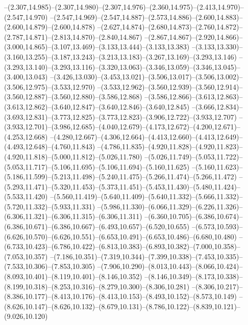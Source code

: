   --(2.307,14.985)--(2.307,14.980)--(2.307,14.976)--(2.360,14.975)--(2.413,14.970)--(2.547,14.970)%
  --(2.547,14.969)--(2.547,14.887)--(2.573,14.886)--(2.600,14.883)--(2.600,14.879)--(2.600,14.878)%
  --(2.627,14.874)--(2.680,14.873)--(2.760,14.872)--(2.787,14.871)--(2.813,14.870)--(2.840,14.867)%
  --(2.867,14.867)--(2.920,14.866)--(3.000,14.865)--(3.107,13.469)--(3.133,13.444)--(3.133,13.383)%
  --(3.133,13.330)--(3.160,13.255)--(3.187,13.243)--(3.213,13.183)--(3.267,13.169)--(3.293,13.146)%
  --(3.293,13.140)--(3.293,13.116)--(3.320,13.063)--(3.346,13.059)--(3.346,13.045)--(3.400,13.043)%
  --(3.426,13.030)--(3.453,13.021)--(3.506,13.017)--(3.506,13.002)--(3.506,12.975)--(3.533,12.970)%
  --(3.533,12.962)--(3.560,12.939)--(3.560,12.914)--(3.560,12.887)--(3.560,12.880)--(3.586,12.868)%
  --(3.586,12.866)--(3.613,12.863)--(3.613,12.862)--(3.640,12.847)--(3.640,12.846)--(3.640,12.845)%
  --(3.666,12.834)--(3.693,12.831)--(3.773,12.825)--(3.773,12.823)--(3.906,12.722)--(3.933,12.707)%
  --(3.933,12.701)--(3.986,12.685)--(4.040,12.679)--(4.173,12.672)--(4.200,12.671)--(4.253,12.668)%
  --(4.280,12.667)--(4.306,12.664)--(4.413,12.660)--(4.413,12.649)--(4.493,12.648)--(4.760,11.843)%
  --(4.786,11.835)--(4.920,11.828)--(4.920,11.823)--(4.920,11.818)--(5.000,11.812)--(5.026,11.780)%
  --(5.026,11.749)--(5.053,11.722)--(5.053,11.717)--(5.106,11.695)--(5.106,11.694)--(5.160,11.625)%
  --(5.160,11.623)--(5.186,11.599)--(5.213,11.498)--(5.240,11.475)--(5.266,11.474)--(5.266,11.472)%
  --(5.293,11.471)--(5.320,11.453)--(5.373,11.451)--(5.453,11.430)--(5.480,11.424)--(5.533,11.420)%
  --(5.560,11.419)--(5.640,11.409)--(5.640,11.332)--(5.666,11.332)--(5.720,11.332)--(5.933,11.331)%
  --(5.986,11.330)--(6.066,11.329)--(6.226,11.326)--(6.306,11.321)--(6.306,11.315)--(6.306,11.311)%
  --(6.360,10.705)--(6.386,10.674)--(6.386,10.671)--(6.386,10.667)--(6.493,10.657)--(6.520,10.655)%
  --(6.573,10.593)--(6.626,10.570)--(6.626,10.551)--(6.653,10.491)--(6.653,10.486)--(6.680,10.480)%
  --(6.733,10.423)--(6.786,10.422)--(6.813,10.383)--(6.893,10.382)--(7.000,10.358)--(7.053,10.357)%
  --(7.186,10.351)--(7.319,10.344)--(7.399,10.338)--(7.453,10.335)--(7.533,10.306)--(7.853,10.305)%
  --(7.906,10.290)--(8.013,10.443)--(8.066,10.424)--(8.093,10.401)--(8.119,10.401)--(8.146,10.352)%
  --(8.146,10.349)--(8.173,10.338)--(8.199,10.318)--(8.253,10.316)--(8.279,10.300)--(8.306,10.281)%
  --(8.306,10.217)--(8.386,10.177)--(8.413,10.176)--(8.413,10.153)--(8.493,10.152)--(8.573,10.149)%
  --(8.626,10.147)--(8.626,10.132)--(8.679,10.131)--(8.786,10.122)--(8.839,10.121)--(9.026,10.120)%

